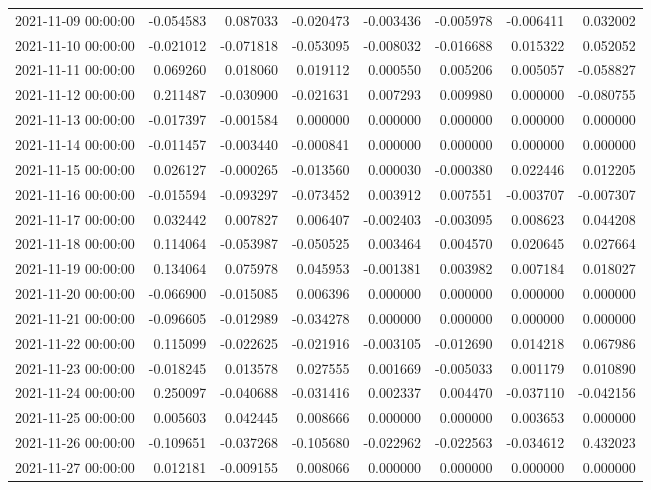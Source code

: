 \begin{tabular}{lrrrrrrr}
2021-11-09 00:00:00 & -0.054583 & 0.087033 & -0.020473 & -0.003436 & -0.005978 & -0.006411 & 0.032002 \\
2021-11-10 00:00:00 & -0.021012 & -0.071818 & -0.053095 & -0.008032 & -0.016688 & 0.015322 & 0.052052 \\
2021-11-11 00:00:00 & 0.069260 & 0.018060 & 0.019112 & 0.000550 & 0.005206 & 0.005057 & -0.058827 \\
2021-11-12 00:00:00 & 0.211487 & -0.030900 & -0.021631 & 0.007293 & 0.009980 & 0.000000 & -0.080755 \\
2021-11-13 00:00:00 & -0.017397 & -0.001584 & 0.000000 & 0.000000 & 0.000000 & 0.000000 & 0.000000 \\
2021-11-14 00:00:00 & -0.011457 & -0.003440 & -0.000841 & 0.000000 & 0.000000 & 0.000000 & 0.000000 \\
2021-11-15 00:00:00 & 0.026127 & -0.000265 & -0.013560 & 0.000030 & -0.000380 & 0.022446 & 0.012205 \\
2021-11-16 00:00:00 & -0.015594 & -0.093297 & -0.073452 & 0.003912 & 0.007551 & -0.003707 & -0.007307 \\
2021-11-17 00:00:00 & 0.032442 & 0.007827 & 0.006407 & -0.002403 & -0.003095 & 0.008623 & 0.044208 \\
2021-11-18 00:00:00 & 0.114064 & -0.053987 & -0.050525 & 0.003464 & 0.004570 & 0.020645 & 0.027664 \\
2021-11-19 00:00:00 & 0.134064 & 0.075978 & 0.045953 & -0.001381 & 0.003982 & 0.007184 & 0.018027 \\
2021-11-20 00:00:00 & -0.066900 & -0.015085 & 0.006396 & 0.000000 & 0.000000 & 0.000000 & 0.000000 \\
2021-11-21 00:00:00 & -0.096605 & -0.012989 & -0.034278 & 0.000000 & 0.000000 & 0.000000 & 0.000000 \\
2021-11-22 00:00:00 & 0.115099 & -0.022625 & -0.021916 & -0.003105 & -0.012690 & 0.014218 & 0.067986 \\
2021-11-23 00:00:00 & -0.018245 & 0.013578 & 0.027555 & 0.001669 & -0.005033 & 0.001179 & 0.010890 \\
2021-11-24 00:00:00 & 0.250097 & -0.040688 & -0.031416 & 0.002337 & 0.004470 & -0.037110 & -0.042156 \\
2021-11-25 00:00:00 & 0.005603 & 0.042445 & 0.008666 & 0.000000 & 0.000000 & 0.003653 & 0.000000 \\
2021-11-26 00:00:00 & -0.109651 & -0.037268 & -0.105680 & -0.022962 & -0.022563 & -0.034612 & 0.432023 \\
2021-11-27 00:00:00 & 0.012181 & -0.009155 & 0.008066 & 0.000000 & 0.000000 & 0.000000 & 0.000000 \\

\end{tabular}
